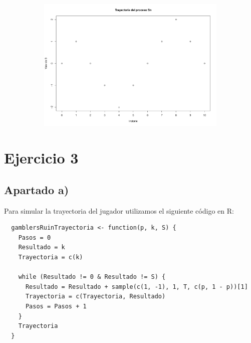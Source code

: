 \documentclass[11pt]{article}
\begin{document}
\begin{figure}[h!]
  \begin{center}
    \begin{subfigure}[b]{\linewidth}
      \includegraphics[width=\linewidth]{trayectoriaS.pdf}
    \end{subfigure}
  \end{center}
\end{figure}


\section{Ejercicio 3}

\subsection*{Apartado a)}

Para simular la trayectoria del jugador utilizamos el siguiente código en R:

\begin{verbatim}
  gamblersRuinTrayectoria <- function(p, k, S) {
    Pasos = 0
    Resultado = k
    Trayectoria = c(k)
    
    while (Resultado != 0 & Resultado != S) {
      Resultado = Resultado + sample(c(1, -1), 1, T, c(p, 1 - p))[1]
      Trayectoria = c(Trayectoria, Resultado)
      Pasos = Pasos + 1
    }
    Trayectoria
  }
\end{verbatim}
\end{document}
